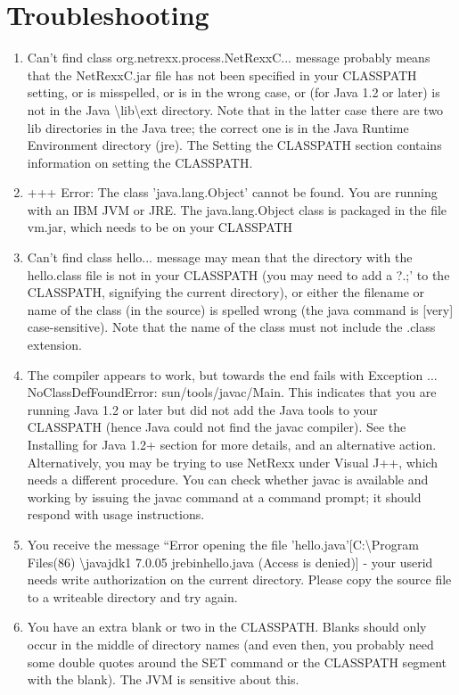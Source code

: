 \chapter{Troubleshooting}
\begin{enumerate} 
\item Can't find class org.netrexx.process.NetRexxC... message
  probably means that the NetRexxC.jar file has not been specified in
  your CLASSPATH setting, or is misspelled, or is in the wrong case,
  or (for Java 1.2 or later) is not in the Java
  \textbackslash lib\textbackslash ext directory. Note that in the latter case there are two lib directories in the Java tree; the correct one is in the Java Runtime Environment directory (jre).
The Setting the CLASSPATH section contains information on setting the CLASSPATH.
\item +++ Error: The class 'java.lang.Object' cannot be found. You are running with an IBM JVM or JRE. The java.lang.Object class is packaged in the file vm.jar, which needs to be on your CLASSPATH
\item Can't find class hello... message may mean that the directory with the hello.class file is not in your CLASSPATH (you may need to add a ?.;’ to the CLASSPATH, signifying the current directory), or either the filename or name of the class (in the source) is spelled wrong (the java command is [very] case-sensitive). Note that the name of the class must not include the .class extension.
\item The compiler appears to work, but towards the end fails with Exception ... NoClassDefFoundError: sun/tools/javac/Main. This indicates that you are running Java 1.2 or later but did not add the Java tools to your CLASSPATH (hence Java could not find the javac compiler). See the Installing for Java 1.2+ section for more details, and an alternative action.
Alternatively, you may be trying to use NetRexx under Visual J++, which needs a different procedure. You can check whether javac is available and working by issuing the javac command at a command prompt; it should respond with usage instructions.
\item You receive the message ``Error opening the file 'hello.java'[C:\textbackslash Program Files(86) \textbackslash javajdk1 7.0.05 jrebinhello.java (Access is denied)] - your userid needs write authorization on the current directory. Please copy the source file to a writeable directory and try again.
\item You have an extra blank or two in the CLASSPATH. Blanks should only occur in the middle of directory names (and even then, you probably need some double quotes around the SET command or the CLASSPATH segment with the blank). The JVM is sensitive about this.

\end{enumerate}
